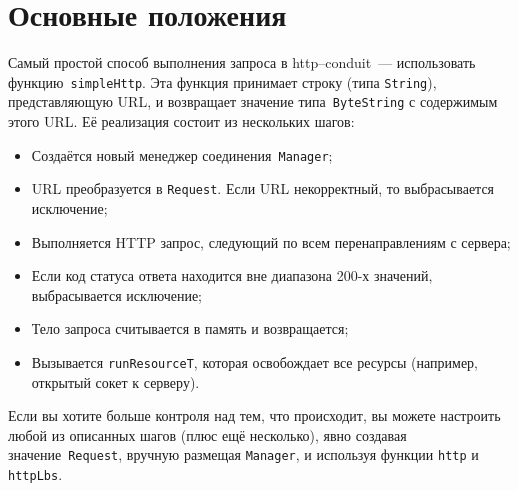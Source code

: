 \section{Основные положения}
Самый простой способ выполнения запроса в http--conduit~--- использовать
функцию~\lstinline!simpleHttp!. Эта функция принимает строку
(типа \lstinline!String!), представляющую URL, и возвращает
значение типа~\lstinline!ByteString! с содержимым этого URL. Её реализация
состоит из нескольких шагов:
\begin{itemize}
\item Создаётся новый менеджер соединения~\lstinline!Manager!;
\item URL преобразуется в \lstinline!Request!. Если URL некорректный,
  то выбрасывается исключение;
\item Выполняется HTTP запрос, следующий по всем перенаправлениям с сервера;
\item Если код статуса ответа находится вне диапазона 200-х значений,
  выбрасывается исключение;
\item Тело запроса считывается в память и возвращается;
\item Вызывается \lstinline!runResourceT!, которая освобождает все
  ресурсы (например, открытый сокет к серверу).
\end{itemize}

Если вы хотите больше контроля над тем, что происходит, вы можете
настроить любой из описанных шагов (плюс ещё несколько), явно создавая
значение~\lstinline!Request!, вручную размещая \lstinline!Manager!, и
используя функции \lstinline!http! и \lstinline!httpLbs!.

